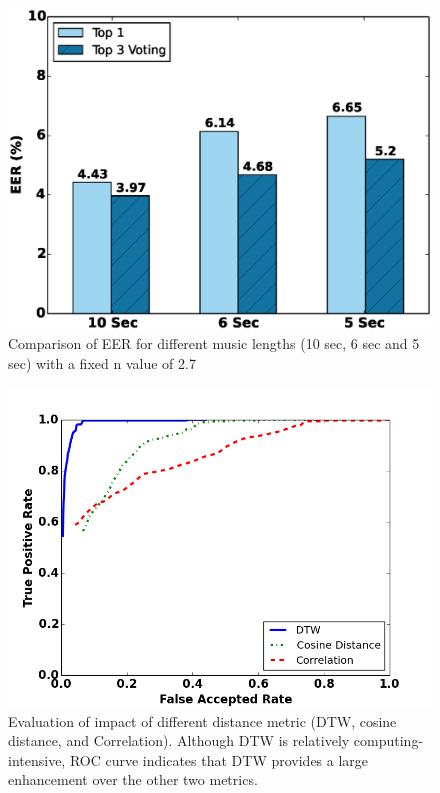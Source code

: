 \begin{figure}[t]
\centering
\includegraphics [width=\columnwidth]{figure/exp2_vary_length.eps}
\caption{Comparison of EER for different music lengths (10 sec, 6 sec and 5 
sec) with a fixed n value of 2.7}
\label{fig:eer-length}
\end{figure}

\begin{figure}
\includegraphics[width=\columnwidth]{figure/roc_dtw_cos_cor.png}
\caption{\label{fig:roc_dtw_cos_cor} Evaluation of impact of different distance metric (DTW, cosine distance, and Correlation). Although DTW is relatively computing-intensive, ROC curve indicates  that DTW provides a large enhancement over the other two metrics. }
\end{figure}

